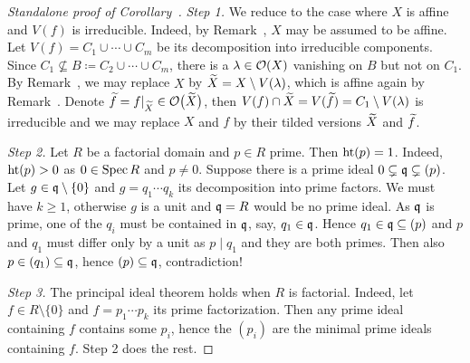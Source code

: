 \documentclass[a4paper,parskip=half,numbers=enddot, DIV=12]{scrreprt}
\begin{document}
\begin{proof}[Standalone proof of Corollary~]
	\emph{Step 1.} We reduce to the case where $X$ is affine and $V(f)$ is irreducible. Indeed, by Remark~, $X$ may be assumed to be affine. Let $V(f)=C_1\cup\cdots\cup C_m$ be its decomposition into irreducible components. Since $C_1\not\subseteq B\coloneqq C_2\cup\cdots\cup C_m$, there is a $\lambda\in\mathcal{O}(X)$ vanishing on $B$ but not on $C_1$. By Remark~, we may replace $X$ by $\snake X=X\setminus V(\lambda)$, which is affine again by Remark~. Denote $\snake f=f|_{\snake X}\in\Oo\big(\snake X\big)$, then $V(f)\cap \snake X=V(\snake f)=C_1\setminus V(\lambda)$ is irreducible and we may replace $X$ and $f$ by their tilded versions $\snake X$ and $\snake f$.
	
	\emph{Step 2.} Let $R$ be a factorial domain and $p\in R$ prime. Then $\operatorname{ht}(p)=1$. Indeed, $\operatorname{ht}(p)>0$ as $0\in\operatorname{Spec} R$ and $p\not=0$. Suppose there is a prime ideal $0\subsetneq\mathfrak{q}\subsetneq(p)$. Let $g\in\mathfrak{q}\setminus\{0\}$ and $g=q_1\cdots q_k$ its decomposition into prime factors. We must have $k\geq 1$, otherwise $g$ is a unit and $\mathfrak{q}=R$ would be no prime ideal. As $\mathfrak{q}$ is prime, one of the $q_i$ must be contained in $\mathfrak{q}$, say, $q_1\in\mathfrak{q}$. Hence $q_1\in \mathfrak{q}\subseteq(p)$ and $p$ and $q_1$ must differ only by a unit as $p\mid q_1$ and they are both primes. Then also $p\in (q_1)\subseteq\mathfrak{q}$, hence $(p)\subseteq\mathfrak{q}$, contradiction!
	
	\emph{Step 3.} The principal ideal theorem holds when $R$ is factorial. Indeed, let $f\in R\setminus\{0\}$ and $f=p_1\cdots p_k$ its prime factorization. Then any prime ideal containing $f$ contains some $p_i$, hence the $(p_i)$ are the minimal prime ideals containing $f$. Step 2 does the rest.
	

\end{proof}
\end{document}

